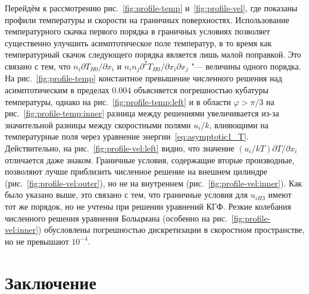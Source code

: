 \documentclass[
aps,%
12pt,%
final,%
notitlepage,%
oneside,%
onecolumn,%
nobibnotes,%
nofootinbib,%
superscriptaddress,%
noshowpacs,%
showkeys,%
floatfix,%
tightenlines,%
centertags]%
{revtex4}
\newcommand{\Pder}[2][]{\partial#1/\partial#2}
\newcommand{\Pderder}[3][]{\partial^2#1/\partial#2\partial#3}
\begin{document}
Перейдём к рассмотрению рис.~\ref{fig:profile-temp} и~\ref{fig:profile-vel},
где показаны профили температуры и скорости на граничных поверхностях.
Использование температурного скачка первого порядка в граничных условиях
позволяет существенно улучшить асимптотическое поле температур,
в то время как температурный скачок следующего порядка является лишь малой поправкой.
Это связано с тем, что \(n_i\Pder[T_{H0}]{x_i}\) и \(n_in_j\Pderder[T_{H0}]{x_i}{x_j}\)
"--- величины одного порядка.
На рис.~\ref{fig:profile-temp} константное превышение численного решения над асимптотическим
в пределах \(0.004\) объясняется погрешностью кубатуры температуры,
однако на рис.~\ref{fig:profile-temp:left} и в области \(\varphi>\pi/3\) на рис.~\ref{fig:profile-temp:inner}
разница между решениями увеличивается из-за значительной разницы между скоростными полями \(u_i/k\),
влияющими на температурные поля через уравнение энергии~\eqref{eq:asymptotic1_T}.
Действительно, на рис.~\ref{fig:profile-vel:left} видно, что значение \((u_i/kT)\Pder[T]{x_i}\)
отличается даже знаком.
Граничные условия, содержащие вторые производные, позволяют лучше приблизить численное решение
на внешнем цилиндре (рис.~\ref{fig:profile-vel:outer}), но не на внутреннем (рис.~\ref{fig:profile-vel:inner}).
Как было указано выше, это связано с тем, что граничные условия для \(u_{iH3}\) имеют тот же порядок,
но не учтены при решении уравнений КГФ. Резкие колебания численного решения уравнения Больцмана
(особенно на рис.~\ref{fig:profile-vel:inner}) обусловлены погрешностью дискретизации в скоростном пространстве,
но не превышают \(10^{-4}\).

\section{Заключение}
\end{document}

